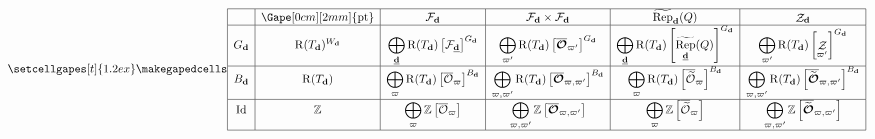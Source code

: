 \documentclass[border={7pt 0pt 160pt 0pt},varwidth]{standalone}
\DeclareMathOperator{\Id}{\operatorname{Id}}
\DeclareMathOperator{\RRep}{\widetilde{\operatorname{Rep}}}
\DeclareMathOperator{\pt}{\operatorname{pt}}
\DeclareMathOperator{\Rpt}{\operatorname{R}}
\DeclareMathOperator{\St}{\mathcal{Z}}
\newcommand{\dimvec}[1]{\mathbf{#1}}
\newcommand{\ftdimvec}[1]{\underline{\dimvec{#1}}}
\newcommand{\ww}{\varpi}
\newcommand{\Wd}{W_{\dimvec{d}}}
\newcommand{\Ocell}{\mathcal{O}}
\newcommand{\OOcell}{\boldsymbol{\mathcal{O}}}
\newcommand{\preimage}[1]{\widetilde{#1}}
\begin{document}
\begin{table}[]
\[
 \setcellgapes[t]{1.2ex}\makegapedcells
\centering
\begin{array}{|c|c|c|c|c|c|}
\hline
      & \Gape[0cm][2mm]{\pt}         & \mathcal{F}_{\dimvec{d}}                                                    & \mathcal{F}_{\dimvec{d}} \times \mathcal{F}_{\dimvec{d}}                &\RRep_{\dimvec{d}}(Q)&   \St_{\dimvec{d}}                      \\
       \hline
G_{\dimvec{d}} & \Rpt(T_{\dimvec{d}})^{\Wd} & \displaystyle\bigoplus_{\ftdimvec{d}}\Rpt(T_{\dimvec{d}})  \left[ \mathcal{F}_{\ftdimvec{d}} \right]^{G_{\dimvec{d}}}                                                      & \displaystyle\bigoplus_{\ww'} \Rpt(T_{\dimvec{d}})  \left[ \overline{\OOcell}_{\ww'} \right]^{G_{\dimvec{d}}}
& \displaystyle\bigoplus_{\ftdimvec{d}}\Rpt(T_{\dimvec{d}})    \left[ \RRep_{\ftdimvec{d}}(Q) \right]^{G_{\dimvec{d}}}                                                                             & \displaystyle\bigoplus_{\ww'} \Rpt(T_{\dimvec{d}})  \left[ \St_{\ww'} \right]^{G_{\dimvec{d}}} \\ \hline
{B_{\dimvec{d}}}     & \Rpt(T_{\dimvec{d}})     & \displaystyle\bigoplus_{\ww} \Rpt(T_{\dimvec{d}}) \left[ \overline{\Ocell}_{\ww} \right]^{B_{\dimvec{d}}}  & \displaystyle\bigoplus_{\ww,\ww'} \Rpt(T_{\dimvec{d}}) \left[ \overline{\OOcell}_{\ww,\ww'} \right]^{B_{\dimvec{d}}}
& \displaystyle\bigoplus_{\ww} \Rpt(T_{\dimvec{d}}) \left[ \overline{\preimage{\Ocell}}_{\ww} \right]^{B_{\dimvec{d}}}  & \displaystyle\bigoplus_{\ww,\ww'} \Rpt(T_{\dimvec{d}}) \left[ \overline{\preimage{\OOcell}}_{\ww,\ww'} \right]^{B_{\dimvec{d}}}    \\ \hline
\Id   & \mathbb{Z}  & \displaystyle\bigoplus_{\ww} \mathbb{Z} \left[ \overline{\Ocell}_{\ww} \right] & \displaystyle\bigoplus_{\ww,\ww'} \mathbb{Z} \left[ \overline{\OOcell}_{\ww,\ww'} \right]
& \displaystyle\bigoplus_{\ww} \mathbb{Z} \left[ \overline{\preimage{\Ocell}}_{\ww} \right] & \displaystyle\bigoplus_{\ww,\ww'} \mathbb{Z} \left[ \overline{\preimage{\OOcell}}_{\ww,\ww'} \right]   \\ \hline
\end{array}
\]
\end{table}
\end{document}
